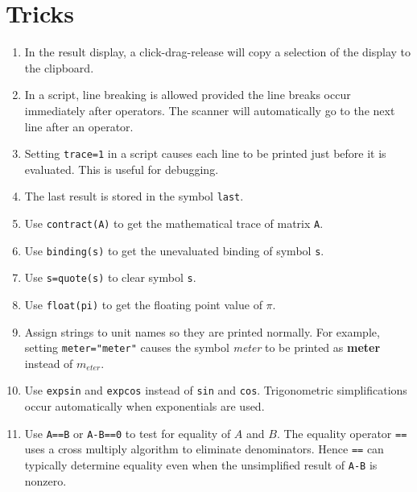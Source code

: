 \section{Tricks}
\begin{enumerate}

\item
In the result display, a click-drag-release will copy a selection of the display to the clipboard.

\item
In a script, line breaking is allowed provided the line breaks occur immediately after operators.
The scanner will automatically go to the next line after an operator.

\item
Setting \verb$trace=1$ in a script causes each line to be printed just before it is evaluated.
This is useful for debugging.

\item
The last result is stored in the symbol \verb$last$.

\item
Use \verb$contract(A)$ to get the mathematical trace of matrix \verb$A$.

\item
Use \verb$binding(s)$ to get the unevaluated binding of symbol \verb$s$.

\item
Use \verb$s=quote(s)$ to clear symbol \verb$s$.

\item
Use \verb$float(pi)$ to get the floating point value of $\pi$.

\item
Assign strings to unit names so they are printed normally.
For example, setting \verb$meter="meter"$ causes the symbol {\it meter}
to be printed as {\bf meter} instead of $m_{eter}$.

\item
Use \verb$expsin$ and \verb$expcos$ instead of \verb$sin$ and \verb$cos$.
Trigonometric simplifications occur automatically when exponentials are used.

\item
Use \verb$A==B$ or \verb$A-B==0$ to test for equality of $A$ and $B$.
The equality operator \verb$==$ uses a cross multiply algorithm to eliminate denominators.
Hence \verb$==$ can typically determine equality even when the unsimplified result of \verb$A-B$ is nonzero.

\end{enumerate}
